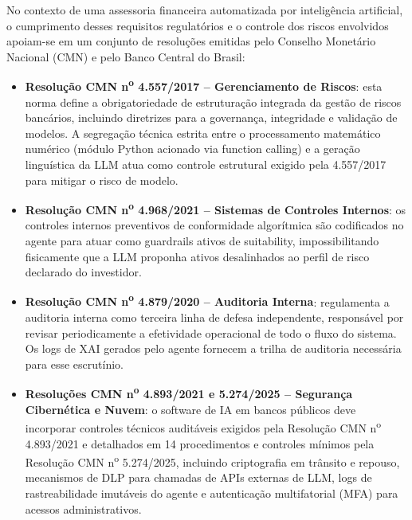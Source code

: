No contexto de uma assessoria financeira automatizada por intelig\^encia
artificial, o cumprimento desses requisitos regulat\'orios e o controle
dos riscos envolvidos apoiam-se em um conjunto de resolu\c{c}\~oes
emitidas pelo Conselho Monet\'ario Nacional (CMN) e pelo Banco Central do
Brasil:

\begin{itemize}
  \item \textbf{Resolu\c{c}\~ao CMN n\textsuperscript{o} 4.557/2017 \autocite{resolucaocmn4557} --
  Gerenciamento de Riscos}: esta norma define a obrigatoriedade de
  estrutura\c{c}\~ao integrada da gest\~ao de riscos banc\'arios, incluindo
  diretrizes para a governan\c{c}a, integridade e valida\c{c}\~ao de
  modelos. A segrega\c{c}\~ao t\'ecnica estrita entre o processamento
  matem\'atico num\'erico (m\'odulo Python acionado via function calling)
  e a gera\c{c}\~ao lingu\'istica da LLM atua como controle estrutural
  exigido pela 4.557/2017 para mitigar o risco de modelo.

  \item \textbf{Resolu\c{c}\~ao CMN n\textsuperscript{o} 4.968/2021 \autocite{resolucaocmn4968} --
  Sistemas de Controles Internos}: os controles internos preventivos de
  conformidade algor\'itmica s\~ao codificados no agente para atuar como
  guardrails ativos de suitability, impossibilitando fisicamente que a
  LLM proponha ativos desalinhados ao perfil de risco declarado do
  investidor.

  \item \textbf{Resolu\c{c}\~ao CMN n\textsuperscript{o} 4.879/2020 \autocite{resolucaocmn4879} --
  Auditoria Interna}: regulamenta a auditoria interna como terceira linha
  de defesa independente, respons\'avel por revisar periodicamente a
  efetividade operacional de todo o fluxo do sistema. Os logs de XAI
  gerados pelo agente fornecem a trilha de auditoria necess\'aria para
  esse escrut\'inio.

  \item \textbf{Resolu\c{c}\~oes CMN n\textsuperscript{o} 4.893/2021 e
  5.274/2025 \autocite{resolucaocmn4893,resolucaocmn5274} -- Seguran\c{c}a Cibern\'etica e Nuvem}: o software de IA em
  bancos p\'ublicos deve incorporar controles t\'ecnicos audit\'aveis exigidos pela
  Resolu\c{c}\~ao CMN n\textsuperscript{o} 4.893/2021 e detalhados em 14
  procedimentos e controles m\'inimos pela Resolu\c{c}\~ao CMN
  n\textsuperscript{o} 5.274/2025, incluindo criptografia em tr\^ansito e
  repouso, mecanismos de DLP para chamadas de APIs externas de LLM, logs
  de rastreabilidade imut\'aveis do agente e autentica\c{c}\~ao
  multifatorial (MFA) para acessos administrativos.
\end{itemize}

